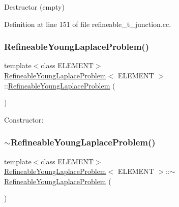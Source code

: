 Destructor (empty) 



Definition at line 151 of file refineable\+\_\+t\+\_\+junction.\+cc.

\mbox{\label{classRefineableYoungLaplaceProblem_a78f77a299f2770a82378fcccf86a0b71}} 
\subsubsection{\texorpdfstring{Refineable\+Young\+Laplace\+Problem()}{RefineableYoungLaplaceProblem()}\hspace{0.1cm}{\footnotesize\ttfamily [2/3]}}
{\footnotesize\ttfamily template$<$class E\+L\+E\+M\+E\+NT$>$ \\
\hyperlink{classRefineableYoungLaplaceProblem}{Refineable\+Young\+Laplace\+Problem}$<$ E\+L\+E\+M\+E\+NT $>$\+::\hyperlink{classRefineableYoungLaplaceProblem}{Refineable\+Young\+Laplace\+Problem} (\begin{DoxyParamCaption}{ }\end{DoxyParamCaption})}



Constructor\+: 

\mbox{\label{classRefineableYoungLaplaceProblem_a24b45d5ecdd1d7dbb678e7f74777bf41}} 
\subsubsection{\texorpdfstring{$\sim$\+Refineable\+Young\+Laplace\+Problem()}{~RefineableYoungLaplaceProblem()}\hspace{0.1cm}{\footnotesize\ttfamily [2/3]}}
{\footnotesize\ttfamily template$<$class E\+L\+E\+M\+E\+NT$>$ \\
\hyperlink{classRefineableYoungLaplaceProblem}{Refineable\+Young\+Laplace\+Problem}$<$ E\+L\+E\+M\+E\+NT $>$\+::$\sim$\hyperlink{classRefineableYoungLaplaceProblem}{Refineable\+Young\+Laplace\+Problem} (\begin{DoxyParamCaption}{ }\end{DoxyParamCaption})\hspace{0.3cm}{\ttfamily [inline]}}



